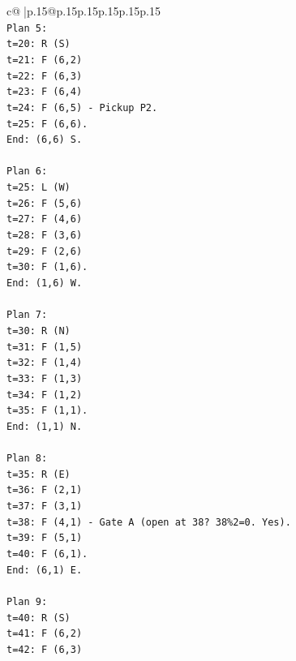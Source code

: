 \documentclass{article}
\begin{document}
{\begin{supertabular}{c@{$\;$}|p{.15\linewidth}@{}p{.15\linewidth}p{.15\linewidth}p{.15\linewidth}p{.15\linewidth}p{.15\linewidth}}
{{{\\ 
\texttt{Plan 5:} \\
\texttt{t=20: R (S)} \\
\texttt{t=21: F (6,2)} \\
\texttt{t=22: F (6,3)} \\
\texttt{t=23: F (6,4)} \\
\texttt{t=24: F (6,5) {-} Pickup P2.} \\
\texttt{t=25: F (6,6).} \\
\texttt{End: (6,6) S.} \\
\\ 
\texttt{Plan 6:} \\
\texttt{t=25: L (W)} \\
\texttt{t=26: F (5,6)} \\
\texttt{t=27: F (4,6)} \\
\texttt{t=28: F (3,6)} \\
\texttt{t=29: F (2,6)} \\
\texttt{t=30: F (1,6).} \\
\texttt{End: (1,6) W.} \\
\\ 
\texttt{Plan 7:} \\
\texttt{t=30: R (N)} \\
\texttt{t=31: F (1,5)} \\
\texttt{t=32: F (1,4)} \\
\texttt{t=33: F (1,3)} \\
\texttt{t=34: F (1,2)} \\
\texttt{t=35: F (1,1).} \\
\texttt{End: (1,1) N.} \\
\\ 
\texttt{Plan 8:} \\
\texttt{t=35: R (E)} \\
\texttt{t=36: F (2,1)} \\
\texttt{t=37: F (3,1)} \\
\texttt{t=38: F (4,1) {-} Gate A (open at 38? 38\%2=0. Yes).} \\
\texttt{t=39: F (5,1)} \\
\texttt{t=40: F (6,1).} \\
\texttt{End: (6,1) E.} \\
\\ 
\texttt{Plan 9:} \\
\texttt{t=40: R (S)} \\
\texttt{t=41: F (6,2)} \\
\texttt{t=42: F (6,3)} \\
}}}
\end{supertabular}}
\end{document}
